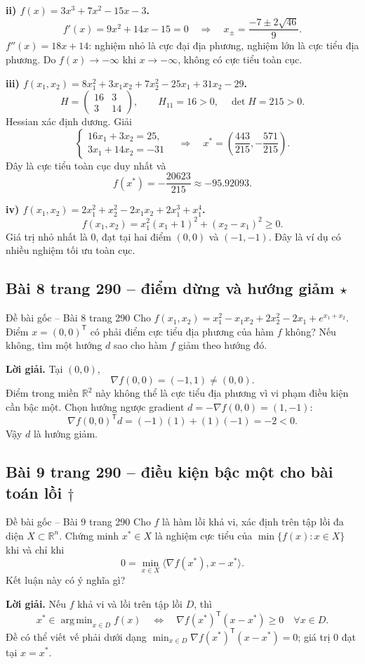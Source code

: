 \documentclass[11pt,a4paper]{article}
\newcommand{\R}{\mathbb{R}}
\newcommand{\grad}{\nabla}
\newcommand{\T}{^{\mathsf T}}
\DeclareMathOperator*{\argmin}{arg\,min}
\begin{document}
\textbf{ii) \(f(x)=3x^3+7x^2-15x-3\).}
\[
f'(x)=9x^2+14x-15=0
\quad\Longrightarrow\quad x_{\pm}=\frac{-7\pm2\sqrt{46}}9.
\]
\(f''(x)=18x+14\): nghiệm nhỏ là cực đại địa phương, nghiệm lớn là cực tiểu địa phương. Do \(f(x)\to-\infty\) khi \(x\to-\infty\), không có cực tiểu toàn cục.

\textbf{iii) \(f(x_1,x_2)=8x_1^2+3x_1x_2+7x_2^2-25x_1+31x_2-29\).}
\[
H=\begin{pmatrix}16&3\\3&14\end{pmatrix},\qquad H_{11}=16>0,\quad \det H=215>0.
\]
Hessian xác định dương. Giải
\[
\begin{cases}16x_1+3x_2=25,\\3x_1+14x_2=-31\end{cases}
\quad\Longrightarrow\quad
x^\ast=\left(\frac{443}{215},-\frac{571}{215}\right).
\]
Đây là cực tiểu toàn cục duy nhất và
\[
f(x^\ast)=-\frac{20623}{215}\approx-95.92093.
\]

\textbf{iv) \(f(x_1,x_2)=2x_1^2+x_2^2-2x_1x_2+2x_1^3+x_1^4\).}
\[
f(x_1,x_2)=x_1^2(x_1+1)^2+(x_2-x_1)^2\ge0.
\]
Giá trị nhỏ nhất là \(0\), đạt tại hai điểm \((0,0)\) và \((-1,-1)\). Đây là ví dụ có nhiều nghiệm tối ưu toàn cục.

\subsection{Bài 8 trang 290 -- điểm dừng và hướng giảm \(\star\)}
\begin{questionbox}{Đề bài gốc -- Bài 8 trang 290}
Cho \(f(x_1,x_2)=x_1^2-x_1x_2+2x_2^2-2x_1+e^{x_1+x_2}\). Điểm \(x=(0,0)\T\) có phải điểm cực tiểu địa phương của hàm \(f\) không? Nếu không, tìm một hướng \(d\) sao cho hàm \(f\) giảm theo hướng đó.
\end{questionbox}
\textbf{Lời giải.}
Tại \((0,0)\),
\[
\grad f(0,0)=(-1,1)\ne(0,0).
\]
Điểm trong miền \(\R^2\) này không thể là cực tiểu địa phương vì vi phạm điều kiện cần bậc một. Chọn hướng ngược gradient \(d=-\grad f(0,0)=(1,-1)\):
\[
\grad f(0,0)\T d=(-1)(1)+(1)(-1)=-2<0.
\]
Vậy \(d\) là hướng giảm.

\subsection{Bài 9 trang 290 -- điều kiện bậc một cho bài toán lồi \(\dagger\)}
\begin{questionbox}{Đề bài gốc -- Bài 9 trang 290}
Cho \(f\) là hàm lồi khả vi, xác định trên tập lồi đa diện \(X\subset\R^n\). Chứng minh \(x^\ast\in X\) là nghiệm cực tiểu của \(\min\{f(x):x\in X\}\) khi và chỉ khi
\[
0=\min_{x\in X}\langle\nabla f(x^\ast),x-x^\ast\rangle.
\]
Kết luận này có ý nghĩa gì?
\end{questionbox}
\textbf{Lời giải.} Nếu \(f\) khả vi và lồi trên tập lồi \(D\), thì
\[
x^\ast\in\argmin_{x\in D}f(x)
\quad\Longleftrightarrow\quad
\grad f(x^\ast)\T(x-x^\ast)\ge0\quad\forall x\in D.
\]
Đề có thể viết vế phải dưới dạng \(\min_{x\in D}\grad f(x^\ast)\T(x-x^\ast)=0\); giá trị \(0\) đạt tại \(x=x^\ast\).
\end{document}
